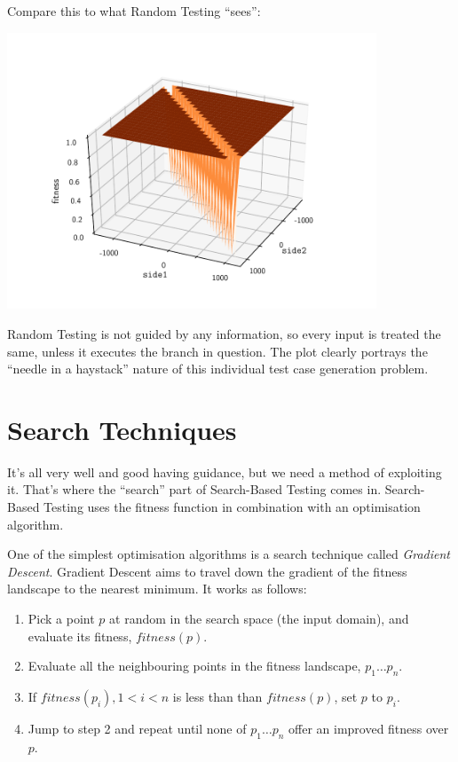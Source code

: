 Compare this to what Random Testing ``sees'':

\begin{center}
    \vspace{-1em}
    \includegraphics[width=11cm]{plots/rt-side1-equals-side2.pdf}
    \vspace{-1em}
\end{center}

Random Testing is not guided by any information, so every input is treated the
same, unless it executes the branch in question. The plot clearly portrays the
``needle in a haystack'' nature of this individual test case generation problem.

\section{Search Techniques}

It's all very well and good having guidance, but we need a method of exploiting
it. That's where the ``search'' part of Search-Based Testing comes in.
Search-Based Testing uses the fitness function in combination with an
optimisation algorithm. 

One of the simplest optimisation algorithms is a search technique called {\it
Gradient Descent}. Gradient Descent aims to travel down the gradient of the
fitness landscape to the nearest minimum. It works as follows:

\begin{enumerate}
    \item Pick a point $p$ at random in the search space (the input domain), and
    evaluate its fitness, $\mathit{fitness}(p)$.

    \item Evaluate all the neighbouring points in the fitness landscape, $p_1
    \dots p_n$.

    \item If $\mathit{fitness}(p_i), 1 < i < n$ is less than than
    $\mathit{fitness}(p)$, set $p$ to $p_i$.

    \item Jump to step 2 and repeat until none of $p_1 \dots p_n$ offer an
    improved fitness over $p$.
\end{enumerate}

